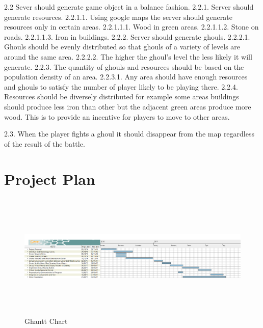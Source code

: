 \documentclass[11pt,openright,a4paper]{report}
\newcommand{\forceindent}{\leavevmode{\parindent=1em\indent}}
\begin{document}
		\forceindent 2.2 Sever should generate game object in a balance fashion.\newline
		\forceindent \forceindent 2.2.1. Server should generate resources.\newline
		\forceindent \forceindent \forceindent 2.2.1.1. Using google maps the server should generate resources only in certain areas.\newline
		\forceindent \forceindent \forceindent \forceindent 2.2.1.1.1. Wood in green areas.\newline
		\forceindent \forceindent \forceindent \forceindent 2.2.1.1.2. Stone on roads.\newline
		\forceindent \forceindent \forceindent \forceindent 2.2.1.1.3. Iron in buildings.\newline
		\forceindent \forceindent 2.2.2. Server should generate ghouls.\newline
		\forceindent \forceindent \forceindent 2.2.2.1. Ghouls should be evenly distributed so that ghouls of a variety of levels are around the same area.\newline
		\forceindent \forceindent \forceindent 2.2.2.2. The higher the ghoul's level the less likely it will generate. \newline
		\forceindent \forceindent 2.2.3. The quantity of ghouls and resources should be based on the population density of an area.\newline
		\forceindent \forceindent \forceindent 2.2.3.1. Any area should have enough resources and ghouls to satisfy the number of player likely to be playing there. \newline
		\forceindent \forceindent 2.2.4. Resources should be diversely distributed for example some areas buildings should produce less iron than other but the adjacent green areas produce more wood. This is to provide an incentive for players to move to other areas. \newline
		
		\forceindent2.3. When the player fights a ghoul it should disappear from the map regardless of the result of the battle.\newline
		
		\section{Project Plan}
		\begin{figure}[h]
			\includegraphics[width=150mm,height=60mm]{ProjectGanttChart.png}
			\caption{Ghantt Chart}
		\end{figure}
		
\end{document}
